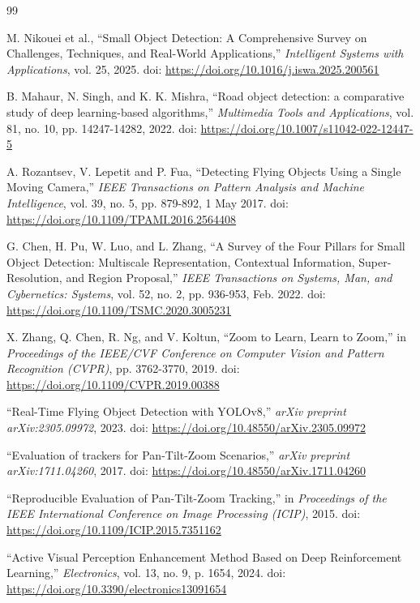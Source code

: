 \documentclass[conf]{new-aiaa}
\begin{document}
\begin{thebibliography}{99}

M. Nikouei et al., ``Small Object Detection: A Comprehensive Survey on Challenges, Techniques, and Real-World Applications,'' \textit{Intelligent Systems with Applications}, vol. 25, 2025. doi: \url{https://doi.org/10.1016/j.iswa.2025.200561}

B. Mahaur, N. Singh, and K. K. Mishra, ``Road object detection: a comparative study of deep learning-based algorithms,'' \textit{Multimedia Tools and Applications}, vol. 81, no. 10, pp. 14247-14282, 2022. doi: \url{https://doi.org/10.1007/s11042-022-12447-5}

A. Rozantsev, V. Lepetit and P. Fua, ``Detecting Flying Objects Using a Single Moving Camera,'' \textit{IEEE Transactions on Pattern Analysis and Machine Intelligence}, vol. 39, no. 5, pp. 879-892, 1 May 2017. doi: \url{https://doi.org/10.1109/TPAMI.2016.2564408}

G. Chen, H. Pu, W. Luo, and L. Zhang, ``A Survey of the Four Pillars for Small Object Detection: Multiscale Representation, Contextual Information, Super-Resolution, and Region Proposal,'' \textit{IEEE Transactions on Systems, Man, and Cybernetics: Systems}, vol. 52, no. 2, pp. 936-953, Feb. 2022. doi: \url{https://doi.org/10.1109/TSMC.2020.3005231}

X. Zhang, Q. Chen, R. Ng, and V. Koltun, ``Zoom to Learn, Learn to Zoom,'' in \textit{Proceedings of the IEEE/CVF Conference on Computer Vision and Pattern Recognition (CVPR)}, pp. 3762-3770, 2019. doi: \url{https://doi.org/10.1109/CVPR.2019.00388}

``Real-Time Flying Object Detection with YOLOv8,'' \textit{arXiv preprint arXiv:2305.09972}, 2023. doi: \url{https://doi.org/10.48550/arXiv.2305.09972}

``Evaluation of trackers for Pan-Tilt-Zoom Scenarios,'' \textit{arXiv preprint arXiv:1711.04260}, 2017. doi: \url{https://doi.org/10.48550/arXiv.1711.04260}

``Reproducible Evaluation of Pan-Tilt-Zoom Tracking,'' in \textit{Proceedings of the IEEE International Conference on Image Processing (ICIP)}, 2015. doi: \url{https://doi.org/10.1109/ICIP.2015.7351162}

``Active Visual Perception Enhancement Method Based on Deep Reinforcement Learning,'' \textit{Electronics}, vol. 13, no. 9, p. 1654, 2024. doi: \url{https://doi.org/10.3390/electronics13091654}


\end{thebibliography}
\end{document}
